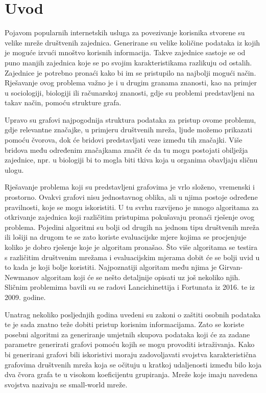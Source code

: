 \chapter{Uvod}

Pojavom popularnih internetskih usluga za povezivanje korisnika stvorene su velike mreže društvenih zajednica. Generirane su velike količine podataka iz kojih je moguće izvući mnoštvo korisnih informacija. Takve zajednice sastoje se od puno manjih zajednica koje se po svojim karakteristikama razlikuju od ostalih. Zajednice je potrebno pronaći kako bi im se pristupilo na najbolji mogući način. Rješavanje ovog problema važno je i u drugim granama znanosti, kao na primjer u sociologiji, biologiji ili računarskoj znanosti, gdje su problemi predstavljeni na takav način, pomoću strukture grafa. 

Upravo su grafovi najpogodnija struktura podataka za pristup ovome problemu, gdje relevantne značajke, u primjeru društvenih mreža, ljude možemo prikazati pomoću čvorova, dok će bridovi predstavljati veze između tih značajki. Više bridova među određenim značajkama značit će da tu mogu postojati obilježja zajednice, npr. u biologiji bi to mogla biti tkiva koja u organima obavljaju sličnu ulogu. 

Rješavanje problema koji su predstavljeni grafovima je vrlo složeno, vremenski i prostorno. Ovakvi grafovi nisu jednostavnog oblika, ali u njima postoje određene pravilnosti, koje se mogu iskoristiti. U tu svrhu razvijeno je mnogo algoritama za otkrivanje zajednica koji različitim pristupima pokušavaju pronaći rješenje ovog problema. Pojedini algoritmi su bolji od drugih na jednom tipu društvenih mreža ili lošiji na drugom te se zato koriste evaluacijske mjere kojima se procjenjuje koliko je dobro rješenje koje je algoritam pronašao. Što više algoritama se testira s različitim društvenim mrežama i evaluacijskim mjerama dobit će se bolji uvid u to kada je koji bolje koristiti. Najpoznatiji algoritam među njima je Girvan-Newmanov algoritam koji će se nešto detaljnije opisati uz još nekoliko njih. Sličnim problemima bavili su se radovi Lancichinettija i Fortunata \cite{fortunato2016community} iz 2016. te \cite{lancichinetti2009community} iz 2009. godine.

Unatrag nekoliko posljednjih  godina uvedeni su zakoni o zaštiti osobnih podataka te je sada znatno teže dobiti pristup korisnim informacijama. Zato se koriste posebni algoritmi za generiranje umjetnih skupova podataka koji će za zadane parametre generirati grafovi pomoću kojih se mogu provoditi istraživanja. Kako bi generirani grafovi bili iskoristivi moraju zadovoljavati svojstva karakteristična grafovima društvenih mreža koja se očituju u kratkoj udaljenosti između bilo koja dva čvora grafa te u visokom koeficijentu grupiranja. Mreže koje imaju navedena svojstva nazivaju se small-world mreže.

